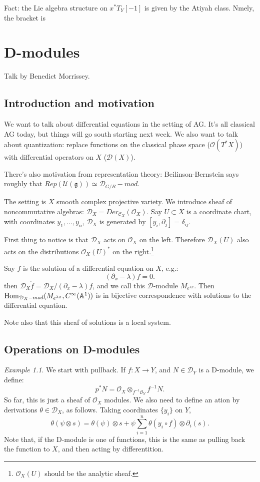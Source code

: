 \documentclass[10pt,a4paper,reqno,oneside]{book} %
\theoremstyle{plain}
\theoremstyle{definition}
\theoremstyle{remark}
\newtheorem{eg}[thm]{Example}
\numberwithin{equation}{section}
\begin{document}
Fact: the Lie algebra structure on $x^* T_Y[-1]$ is given by the Atiyah class. Nmely, the bracket is 




\chapter{D-modules}
Talk by Benedict Morrissey.

\section{Introduction and motivation}

We want to talk about differential equations in the setting of AG. It's all classical AG today, but things will go south starting
next week. We also want to talk about quantization: replace functions on the classical phase space ($\mathcal{O}(T^*X)$) with
differential operators on $X$ ($\mathcal{D}(X)$).

There's also motivation from representation theory: Beilinson-Bernstein says roughly that $Rep(\mathcal{U}(\mathfrak g))
\simeq \mathcal{D}_{G/B} - mod$.

The setting is $X$ smooth complex projective variety. We introduce sheaf of noncommutative algebras: $\mathcal{D}_X
 = Der_{\mathcal{C}_X}(\mathcal{O}_X)$. Say $U \subset X$ is a coordinate chart, with coordinates $y_1, \dots, y_n$,
$\mathcal{D}_X$ is generated by $[y_i, \partial_j] = \delta_{ij}$.

First thing to notice is that $\mathcal{D}_X$ acts on $\mathcal{O}_X$ on the left. Therefore $\mathcal{D}_X(U)$ also
acts on the distributions $\mathcal{O}_X(U)^*$ on the right.\footnote{$\mathcal{O}_X(U)$ should be the analytic sheaf.}

Say $f$ is the solution of a differential equation on $X$, e.g.:
\[	(\partial_x - \lambda) f = 0. 	\]
then $\mathcal{D}_X \dot f = \mathcal{D}_X / (\partial_x - \lambda) f$, and we call this $\mathcal{D}$-module
$M_{e^{\lambda x}}$. Then $\operatorname{Hom}_{\mathcal{D}_X -mod}(M_{e^{\lambda x}}, C^{\infty}(\mathbb A^1))$ is in bijective
correspondence with solutions to the differential equation.

Note also that this sheaf of solutions is a local system. 


\section{Operations on D-modules}
\begin{eg}
We start with pullback. If $f:X \to Y$, and $N \in \mathcal{D}_Y$ is a D-module, we define:
\[	p^*N = \mathcal{O}_X \otimes_{f^{-1} \mathcal{O}_Y} f^{-1} N.	\]
So far, this is just a sheaf of $\mathcal{O}_X$ modules. We also need to define an ation by derivations $\theta \in \mathcal{D}_X$,
as follows.  Taking coordinates $\{y_i\}$ on $Y$,
\[	\theta(\psi \otimes s) = \theta(\psi) \otimes s + \psi \sum_{i=1}^n \theta(y_i \circ f) \otimes \partial_i(s).	\]
Note that, if the D-module is one of functions, this is the same as pulling back the function to $X$, and then acting by differentition.
\end{eg}
\end{document}

